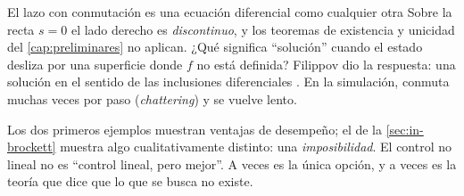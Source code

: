 \begin{trampa}[label=tr:in-discontinuo]{El lazo con conmutación es una ecuación diferencial como cualquier otra}
Sobre la recta $s=0$ el lado derecho es \emph{discontinuo}, y los teoremas de existencia y unicidad del \cref{cap:preliminares} no aplican. ¿Qué significa ``solución'' cuando el estado desliza por una superficie donde $f$ no está definida? Filippov dio la respuesta: una solución en el sentido de las inclusiones diferenciales \citep{Fil88}. En la simulación,  conmuta muchas veces por paso (\emph{chattering}) y se vuelve lento.
\end{trampa}

Los dos primeros ejemplos muestran ventajas de desempeño; el de la \cref{sec:in-brockett} muestra algo cualitativamente distinto: una \emph{imposibilidad}. El control no lineal no es ``control lineal, pero mejor''. A veces es la única opción, y a veces es la teoría que dice que lo que se busca no existe.
